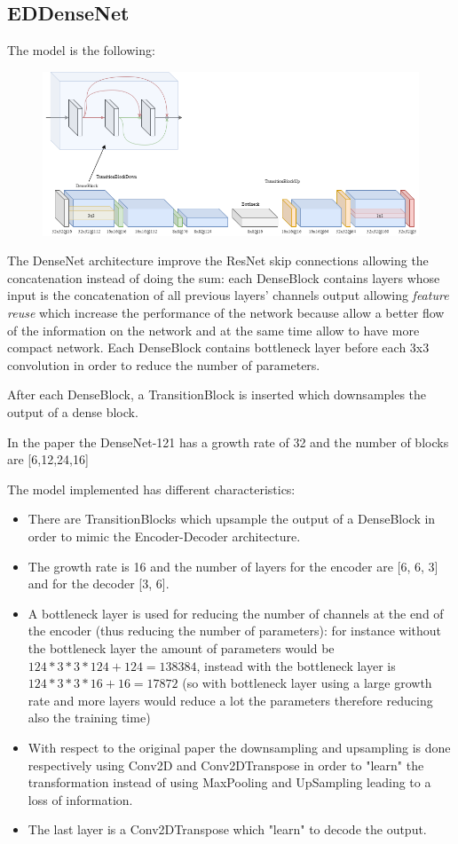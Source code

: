 \subsection{EDDenseNet}
The model is the following:
\begin{figure}[H]
    \centering
    \includegraphics[scale=0.5]{subsections/densenet/densenet.png}
\end{figure}

The DenseNet\cite{densenet} architecture improve the ResNet skip connections allowing the concatenation instead of doing the sum: each DenseBlock contains layers whose input is the concatenation of all previous layers' channels output allowing \textit{feature reuse} which increase the performance of the network because allow a better flow of the information on the network and at the same time allow to have more compact network.
Each DenseBlock contains bottleneck layer before each 3x3 convolution in order to reduce the number of parameters.

After each DenseBlock, a TransitionBlock is inserted which downsamples the output of a dense block.

In the paper the DenseNet-121 has a growth rate of 32 and the number of blocks are [6,12,24,16]  

The model implemented has different characteristics:
\begin{itemize}
    \item There are TransitionBlocks which upsample the output of a DenseBlock in order to mimic the Encoder-Decoder architecture.
    \item The growth rate is 16 and the number of layers for the encoder are [6, 6, 3] and for the decoder [3, 6].
    \item A bottleneck layer is used for reducing the number of channels at the end of the encoder (thus reducing the number of parameters): for instance without the bottleneck layer the amount of parameters would be $124*3*3*124+124=138384$, instead with the bottleneck layer is $124*3*3*16+16 = 17872$ (so with bottleneck layer using a large growth rate and more layers would reduce a lot the parameters therefore reducing also the training time)
    \item With respect to the original paper the downsampling and upsampling is done respectively using Conv2D and Conv2DTranspose in order to "learn" the transformation instead of using MaxPooling and UpSampling leading to a loss of information.
    \item The last layer is a Conv2DTranspose which "learn" to decode the output.
\end{itemize}
